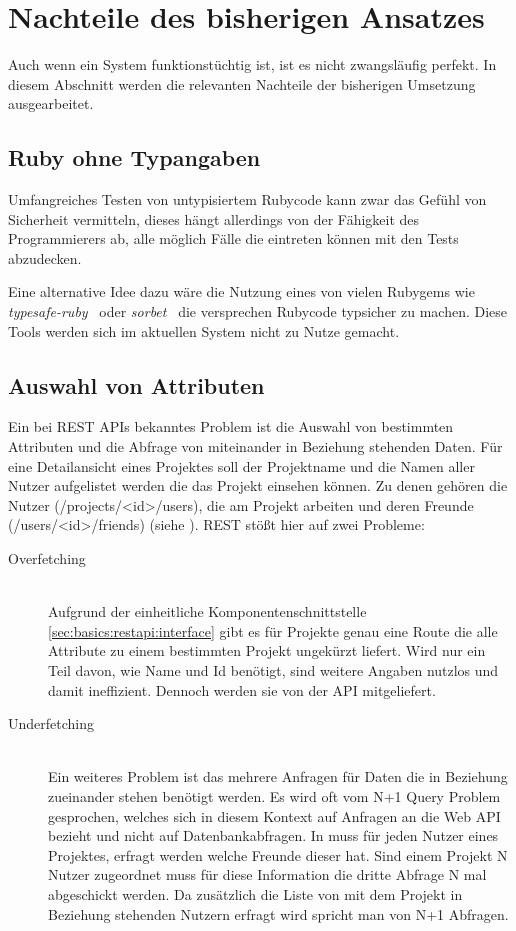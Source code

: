 \section{Nachteile des bisherigen Ansatzes}
\label{sec:requirements:cons:typescript}
Auch wenn ein System funktionstüchtig ist, ist es nicht zwangsläufig perfekt.
In diesem Abschnitt werden die relevanten Nachteile der bisherigen Umsetzung ausgearbeitet.

\subsection{Ruby ohne Typangaben}
Umfangreiches Testen von untypisiertem Rubycode kann zwar das Gefühl von Sicherheit vermitteln, dieses hängt allerdings von der Fähigkeit des Programmierers ab, alle möglich Fälle die eintreten können mit den Tests abzudecken.

Eine alternative Idee dazu wäre die Nutzung eines von vielen Rubygems wie \emph{typesafe-ruby}~\cite{typesafe-ruby}
oder \emph{sorbet}~\cite{sorbet} die versprechen Rubycode typsicher zu machen. Diese Tools werden sich im aktuellen System nicht zu Nutze gemacht.

\subsection{Auswahl von Attributen}
\label{sec:requirements:cons:attributes}
Ein bei REST APIs bekanntes Problem ist die Auswahl von bestimmten Attributen und die Abfrage von miteinander in Beziehung stehenden Daten.
Für eine Detailansicht eines Projektes soll der Projektname und die Namen aller Nutzer aufgelistet werden die das Projekt einsehen können.
Zu denen gehören die Nutzer (/projects/<id>/users), die am Projekt arbeiten und deren Freunde (/users/<id>/friends) (siehe ).
REST stößt hier auf zwei Probleme:

\begin{description}
    \item[Overfetching\label{cons:overfetching}] \ \\
    Aufgrund der einheitliche Komponentenschnittstelle \ref{sec:basics:restapi:interface} gibt es für Projekte genau eine Route die alle Attribute zu einem bestimmten
    Projekt ungekürzt liefert. Wird nur ein Teil davon, wie Name und Id benötigt, sind weitere Angaben nutzlos und damit ineffizient.
    Dennoch werden sie von der API mitgeliefert.
    \item[Underfetching\label{cons:underfetching}] \ \\
    Ein weiteres Problem ist das mehrere Anfragen für Daten die in Beziehung zueinander stehen benötigt werden. Es wird oft vom N+1 Query Problem gesprochen, welches sich in diesem Kontext auf Anfragen an die Web API bezieht und nicht auf Datenbankabfragen.
    In  muss für jeden Nutzer eines Projektes, erfragt werden welche Freunde dieser hat.
    Sind einem Projekt N Nutzer zugeordnet muss für diese Information die dritte Abfrage N mal abgeschickt werden. Da zusätzlich die Liste von mit dem Projekt in Beziehung stehenden Nutzern erfragt wird spricht man von N+1 Abfragen.
\end{description}


